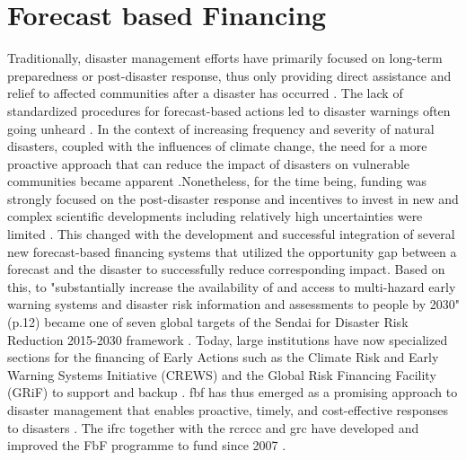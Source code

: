 \section{Forecast based Financing}\label{sec:fbf}

Traditionally, disaster management efforts have primarily focused on long-term preparedness or post-disaster response, thus only providing direct assistance and relief to affected communities after a disaster has occurred \autocite{coughlandeperezForecastbasedFinancingApproach2015,unisdrHyogoFrameworkAction2005}. The lack of standardized procedures for forecast-based actions led to disaster warnings often going unheard \autocite{kolenImpactsStormXynthia2013}. In the context of increasing frequency and severity of natural disasters, coupled with the influences of climate change, the need for a more proactive approach that can reduce the impact of disasters on vulnerable communities became apparent \autocite{coughlandeperezForecastbasedFinancingApproach2015,trisosAfrica2022}.\newline Nonetheless, for the time being, funding was strongly focused on the post-disaster response and incentives to invest in new and complex scientific developments including relatively high uncertainties were limited \autocite{coughlandeperezActionbasedFloodForecasting2016}. This changed with the development and successful integration of several new forecast-based financing systems that utilized the opportunity gap between a forecast and the disaster to successfully reduce corresponding impact. Based on this, to "substantially increase the availability of and access to multi-hazard early warning systems and disaster risk information and assessments to people by 2030" (p.12) became one of seven global targets of the Sendai for Disaster Risk Reduction 2015-2030 framework \autocites{undrrSendaiFrameworkDisaster2015}. Today, large institutions have now specialized sections for the financing of Early Actions such as the Climate Risk and Early Warning Systems Initiative (CREWS) and the Global Risk Financing Facility (GRiF) to support and backup  \autocite{crewsClimateRiskEarly,worldbankGlobalRiskFinancing}. \acrlong{fbf} has thus emerged as a promising approach to disaster management that enables proactive, timely, and cost-effective responses to disasters \autocite{coughlandeperezForecastbasedFinancingApproach2015,grcForecastbasedFinancingInnovative2017}. The \acrfull{ifrc} together with the \acrfull{rcrccc} and \acrfull{grc} have developed and improved the FbF programme to fund  since 2007 \autocite{ifrcForecastbasedFinancingNew2019}. 

